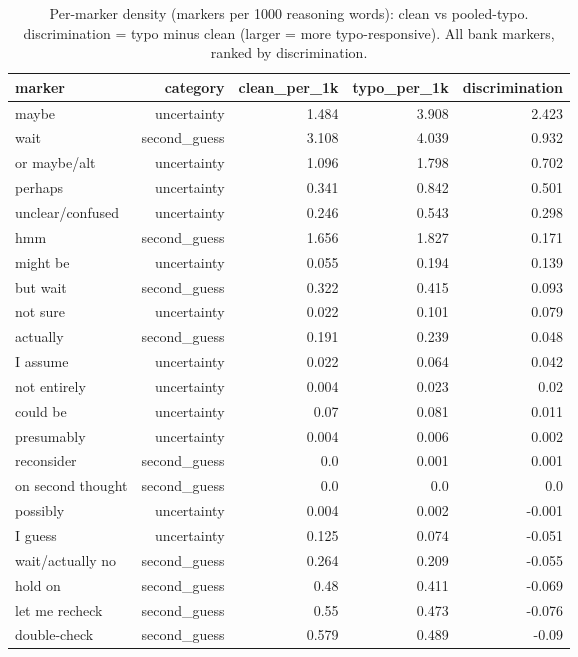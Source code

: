 \documentclass[11pt]{article}
\begin{document}
\begin{table}[H]
\centering
\caption{Per-marker density (markers per 1000 reasoning words): clean vs pooled-typo. discrimination = typo minus clean (larger = more typo-responsive). All bank markers, ranked by discrimination.}
\small
\begin{adjustbox}{max width=\textwidth}
\begin{tabular}{lrrrr}
\toprule
\textbf{marker} & \textbf{category} & \textbf{clean\_per\_1k} & \textbf{typo\_per\_1k} & \textbf{discrimination} \\
\midrule
maybe & uncertainty & 1.484 & 3.908 & 2.423 \\
wait & second\_guess & 3.108 & 4.039 & 0.932 \\
or maybe/alt & uncertainty & 1.096 & 1.798 & 0.702 \\
perhaps & uncertainty & 0.341 & 0.842 & 0.501 \\
unclear/confused & uncertainty & 0.246 & 0.543 & 0.298 \\
hmm & second\_guess & 1.656 & 1.827 & 0.171 \\
might be & uncertainty & 0.055 & 0.194 & 0.139 \\
but wait & second\_guess & 0.322 & 0.415 & 0.093 \\
not sure & uncertainty & 0.022 & 0.101 & 0.079 \\
actually & second\_guess & 0.191 & 0.239 & 0.048 \\
I assume & uncertainty & 0.022 & 0.064 & 0.042 \\
not entirely & uncertainty & 0.004 & 0.023 & 0.02 \\
could be & uncertainty & 0.07 & 0.081 & 0.011 \\
presumably & uncertainty & 0.004 & 0.006 & 0.002 \\
reconsider & second\_guess & 0.0 & 0.001 & 0.001 \\
on second thought & second\_guess & 0.0 & 0.0 & 0.0 \\
possibly & uncertainty & 0.004 & 0.002 & -0.001 \\
I guess & uncertainty & 0.125 & 0.074 & -0.051 \\
wait/actually no & second\_guess & 0.264 & 0.209 & -0.055 \\
hold on & second\_guess & 0.48 & 0.411 & -0.069 \\
let me recheck & second\_guess & 0.55 & 0.473 & -0.076 \\
double-check & second\_guess & 0.579 & 0.489 & -0.09 \\
\bottomrule
\end{tabular}
\end{adjustbox}
\end{table}
\end{document}
